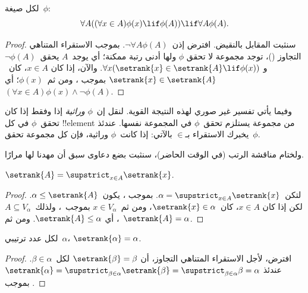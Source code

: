 \documentclass[../../../include/open-logic-section]{subfiles}
\begin{document}
\begin{thm}
لكل صيغة~$\phi$:
\[
	\forall A((\forall x \in A)\phi(x) \lif \phi(A)) \lif \forall A \phi(A).
\]
\end{thm}

\begin{proof}
سنثبت المقابل بالنقيض. افترض إذن~$\lnot \forall A \phi(A)$. بموجب
الاستقراء المتناهي التجاوز
()، توجد مجموعة لا تحقق
$\phi$ ولها أدنى رتبة ممكنة؛ أي يوجد~$A$ يحقق~$\lnot \phi(A)$ و
$\forall x(\setrank{x} \in \setrank{A} \lif \phi(x))$. والآن، إذا كان
$x \in A$، كان~$\setrank{x} \in \setrank{A}$ بموجب
، ومن ثم~$\phi(x)$؛ أي
$(\forall x \in A)\phi(x) \land \lnot \phi(A)$.
\end{proof}\noindent
وفيما يأتي تفسير غير صوري لهذه النتيجة القوية. لنقل إن~$\phi$
\emph{وراثية} إذا وفقط إذا كان تحقق~$\phi$ في كل !!{element} من
مجموعة يستلزم تحقق~$\phi$ في المجموعة نفسها. عندئذ يخبرك الاستقراء
بـ$\in$ بالآتي: إذا كانت~$\phi$ وراثية، فإن كل مجموعة تحقق~$\phi$.

ولختام مناقشة الرتب (في الوقت الحاضر)، سنثبت بضع دعاوى سبق أن مهدنا
لها مرارًا.

\begin{prop}
$\setrank{A} = \supstrict_{x \in A}\setrank{x}$.
\end{prop}

\begin{proof}
لتكن~$\alpha = \supstrict_{x \in A}\setrank{x}$. بموجب
، يكون~$\alpha \leq \setrank{A}$. لكن إذا كان
$x \in A$، كان~$\setrank{x} \in \alpha$، ومن ثم~$x \in V_\alpha$
بموجب~، ولذلك~$A \subseteq V_\alpha$، أي
$\setrank{A} \leq \alpha$. ومن ثم~$\setrank{A} = \alpha$.
\end{proof}

\begin{cor}
لكل عدد ترتيبي~$\alpha$، $\setrank{\alpha} = \alpha$.
\end{cor}

\begin{proof}
افترض، لأجل الاستقراء المتناهي التجاوز، أن
$\setrank{\beta} = \beta$ لكل~$\beta \in \alpha$. عندئذ
$\setrank{\alpha} = \supstrict_{\beta \in \alpha}\setrank{\beta}
= \supstrict_{\beta \in \alpha}\beta = \alpha$ بموجب
.
%
\end{proof}
\end{document}
